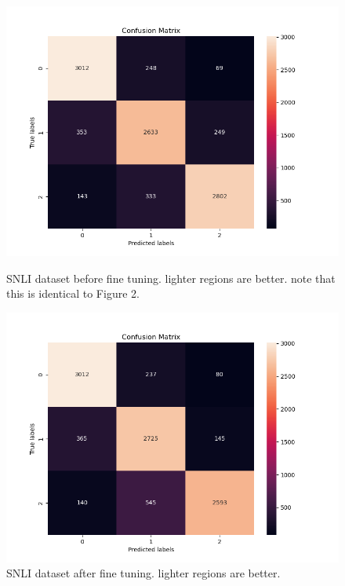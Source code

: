 \documentclass{article}
\begin{document}
\begin{figure}[!h]
	\centering
	\begin{minipage}{0.44\textwidth}
		\includegraphics[width=\linewidth]{figures/snli_trained_confusion.png}
		\caption{SNLI dataset before fine tuning. lighter regions are better. note that this is identical to Figure 2.}
	\end{minipage}
	\hfill
	\begin{minipage}{0.44\textwidth}
		\includegraphics[width=\linewidth]{figures/snli_tuned_confusion.png}
		\caption{SNLI dataset after fine tuning. lighter regions are better.}
	\end{minipage}
\end{figure}
\end{document}
